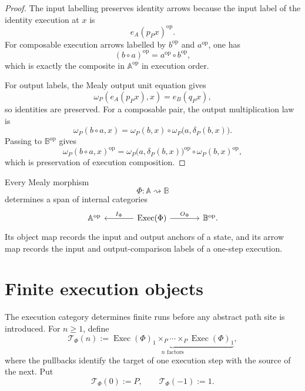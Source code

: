 \begin{proof}
The input labelling preserves identity arrows because the input label of the
identity execution at \(x\) is
\[
    e_A(p_Px)^{\mathrm{op}}.
\]
For composable execution arrows labelled by \(b^{\mathrm{op}}\) and
\(a^{\mathrm{op}}\), one has
\[
    (b\circ a)^{\mathrm{op}}
    =
    a^{\mathrm{op}}\circ b^{\mathrm{op}},
\]
which is exactly the composite in \(\mathbb A^{\mathrm{op}}\) in execution
order.

For output labels, the Mealy output unit equation gives
\[
    \omega_P(e_A(p_Px),x)
    =
    e_B(q_Px),
\]
so identities are preserved. For a composable pair, the output multiplication
law is
\[
    \omega_P(b\circ a,x)
    =
    \omega_P(b,x)
    \circ
    \omega_P\bigl(a,\delta_P(b,x)\bigr).
\]
Passing to \(\mathbb B^{\mathrm{op}}\) gives
\[
    \omega_P(b\circ a,x)^{\mathrm{op}}
    =
    \omega_P\bigl(a,\delta_P(b,x)\bigr)^{\mathrm{op}}
    \circ
    \omega_P(b,x)^{\mathrm{op}},
\]
which is preservation of execution composition.
\end{proof}

\begin{theorem}
\label{thm:labelled-execution-category}
Every Mealy morphism
\[
    \Phi:\mathbb A\rightsquigarrow\mathbb B
\]
determines a span of internal categories
\[
\begin{tikzcd}[column sep=large]
    \mathbb A^{\mathrm{op}}
    &
    \operatorname{Exec}(\Phi)
        \arrow[l, "I_\Phi"']
        \arrow[r, "O_\Phi"]
    &
    \mathbb B^{\mathrm{op}}.
\end{tikzcd}
\]
Its object map records the input and output anchors of a state, and its arrow
map records the input and output-comparison labels of a one-step execution.
\end{theorem}

\section{Finite execution objects}
\label{subsec:finite-execution-objects}

The execution category determines finite runs before any abstract path site is
introduced. For \(n\geq1\), define
\[
    \mathscr T_\Phi(n)
    :=
    \underbrace{
    \operatorname{Exec}(\Phi)_1
    \times_P
    \cdots
    \times_P
    \operatorname{Exec}(\Phi)_1
    }_{n\text{ factors}},
\]
where the pullbacks identify the target of one execution step with the source
of the next. Put
\[
    \mathscr T_\Phi(0):=P,
    \qquad
    \mathscr T_\Phi(-1):=1.
\]

